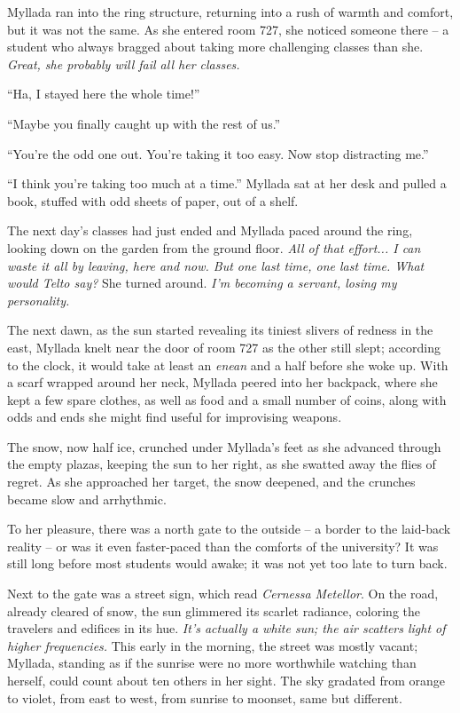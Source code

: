 Myllada ran into the ring structure, returning into a rush of warmth and comfort, but it was not the same. As she entered room 727, she noticed someone there -- a student who always bragged about taking more challenging classes than she. \emph{Great, she probably will fail all her classes.}

``Ha, I stayed here the whole time!''

``Maybe you finally caught up with the rest of us.''

``You're the odd one out. You're taking it too easy. Now stop distracting me.''

``I think you're taking too much at a time.'' Myllada sat at her desk and pulled a book, stuffed with odd sheets of paper, out of a shelf.

\centeredstars

The next day's classes had just ended and Myllada paced around the ring, looking down on the garden from the ground floor. \emph{All of that effort... I can waste it all by leaving, here and now. But one last time, one last time. What would Telto say?} She turned around. \emph{I'm becoming a servant, losing my personality.}

\centeredstars

The next dawn, as the sun started revealing its tiniest slivers of redness in the east, Myllada knelt near the door of room 727 as the other still slept; according to the clock, it would take at least an \emph{enean} and a half before she woke up. With a scarf wrapped around her neck, Myllada peered into her backpack, where she kept a few spare clothes, as well as food and a small number of coins, along with odds and ends she might find useful for improvising weapons.

\centeredstars

The snow, now half ice, crunched under Myllada's feet as she advanced through the empty plazas, keeping the sun to her right, as she swatted away the flies of regret. As she approached her target, the snow deepened, and the crunches became slow and arrhythmic.

To her pleasure, there was a north gate to the outside -- a border to the laid-back reality -- or was it even faster-paced than the comforts of the university? It was still long before most students would awake; it was not yet too late to turn back.

Next to the gate was a street sign, which read \emph{Cernessa Metellor}. On the road, already cleared of snow, the sun glimmered its scarlet radiance, coloring the travelers and edifices in its hue. \emph{It's actually a white sun; the air scatters light of higher frequencies.} This early in the morning, the street was mostly vacant; Myllada, standing as if the sunrise were no more worthwhile watching than herself, could count about ten others in her sight. The sky gradated from orange to violet, from east to west, from sunrise to moonset, same but different.

